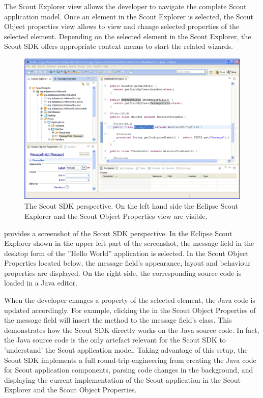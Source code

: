 \documentclass[a4paper,10pt,twoside]{book}
\begin{document}
The Scout Explorer view allows the developer to navigate the complete Scout application model. 
Once an element in the Scout Explorer is selected, the Scout Object properties view allows to view and change selected properties of the selected element. 
Depending on the selected element in the Scout Explorer, the Scout SDK offers appropriate context menus to start the related wizards.

\begin{figure}
\includegraphics[width=14cm]{scout_sdk_perspective.png} 
\caption{The Scout SDK perspective. On the left hand side the Eclipse Scout Explorer and the Scout Object Properties view are visible.}
\end{figure}

 provides a screenshot of the Scout SDK perspective. 
In the Eclipse Scout Explorer shown in the upper left part of the screenshot, the message field in the desktop form of the ''Hello World'' application is selected. 
In the Scout Object Properties located below, the message field's appearance, layout and behaviour properties are displayed. 
On the right side, the corresponding source code is loaded in a Java editor. 

When the developer changes a property of the selected element, the Java code is updated accordingly. 
For example, clicking the  in the Scout Object Properties of the message field will insert the method  to the message field's class. 
This demonstrates how the Scout SDK directly works on the Java source code. 
In fact, the Java source code is the only artefact relevant for the Scout SDK to 'understand' the Scout application model. 
Taking advantage of this setup, the Scout SDK implements a full round-trip-engineering from creating the Java code for Scout application components, parsing code changes in the background, and displaying the current implementation of the Scout application in the Scout Explorer and the Scout Object Properties.
\end{document}
